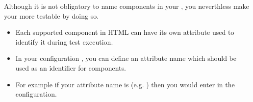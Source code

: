 
Although it is not obligatory to name components in your \gdaut{}, you neverthless make your \gdaut{} more testable by doing so.

\begin{itemize}
\item Each supported component in HTML \gdauts{} can have its own attribute used to identify it during test execution.
\item In your \gdaut{} configuration   , you can define an attribute name which should be used as an identifier for components. 
\item For example if your attribute name is  (e.g. ) then you would enter  in the \gdaut{} configuration. 
\end{itemize}


 
